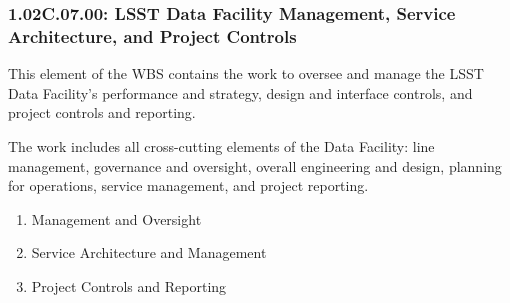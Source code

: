 \subsubsection*{1.02C.07.00: LSST Data Facility Management, Service Architecture, and Project Controls}

This element of the WBS contains the work to oversee and manage the LSST Data Facility's performance and strategy, design and interface controls, and project controls and reporting.

The work includes all cross-cutting elements of the Data Facility: line management, governance and oversight, overall engineering and design, planning for operations, service management, and project reporting.

\begin{enumerate}

  \item{Management and Oversight}
  \item{Service Architecture and Management}
  \item{Project Controls and Reporting}

\end{enumerate}

